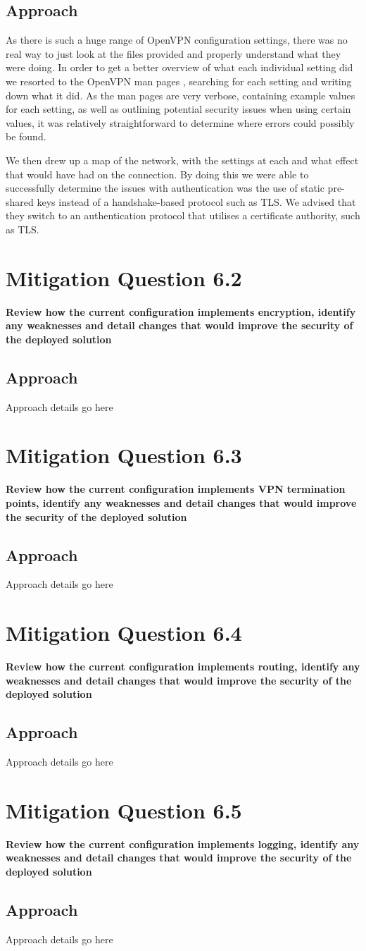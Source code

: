 \subsection{Approach}
As there is such a huge range of OpenVPN configuration settings, there was no
real way to just look at the files provided and properly understand what they
were doing. In order to get a better overview of what each individual setting
did we resorted to the OpenVPN man pages \cite{OpenVPNMan}, searching for each
setting and writing down what it did. As the man pages are very verbose,
containing example values for each setting, as well as outlining potential
security issues when using certain values, it was relatively straightforward to
determine where errors could possibly be found.

We then drew up a map of the network, with the settings at each and what effect
that would have had on the connection. By doing this we were able to
successfully determine the issues with authentication was the use of static
pre-shared keys instead of a handshake-based protocol such as TLS. We advised
that they switch to an authentication protocol that utilises a certificate
authority, such as TLS.

\section{Mitigation Question 6.2}
\textbf{Review how the current configuration implements encryption, identify any
weaknesses and detail changes that would improve the security of the deployed
solution}
\subsection{Approach}
Approach details go here

\section{Mitigation Question 6.3}
\textbf{Review how the current configuration implements VPN termination points,
identify any weaknesses and detail changes that would improve the security of
the deployed solution}
\subsection{Approach}
Approach details go here

\section{Mitigation Question 6.4}
\textbf{Review how the current configuration implements routing, identify any
weaknesses and detail changes that would improve the security of the deployed
solution}
\subsection{Approach}
Approach details go here

\section{Mitigation Question 6.5}
\textbf{Review how the current configuration implements logging, identify any
weaknesses and detail changes that would improve the security of the deployed
solution}
\subsection{Approach}
Approach details go here
